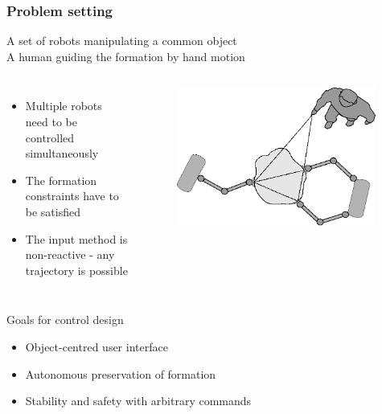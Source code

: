 \documentclass[student]{ITRslides}
\begin{document}
\begin{frame}
	\frametitle{Problem setting}
	
	A set of robots manipulating a common object\\
	A human guiding the formation by hand motion
		\begin{columns}
	\begin{itemize}
	\item Multiple robots need to be controlled simultaneously 
	\item The formation constraints have to be satisfied
	\item The input method is non-reactive - any trajectory is possible
	\end{itemize}
		
	
	
			\begin{figure}
			\centering
			\includegraphics[width=0.98\textwidth]{general_setup.eps}

			\end{figure}
	\end{columns}

	\begin{block}{Goals for control design}
	\begin{itemize}
	\item Object-centred user interface 
	\item Autonomous preservation of formation
	\item Stability and safety with arbitrary commands
	\end{itemize}
	\end{block}	

\end{frame}
\end{document}
